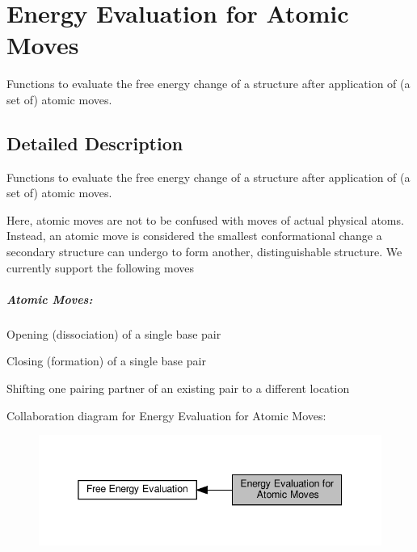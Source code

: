 \hypertarget{group__eval__move}{}\section{Energy Evaluation for Atomic Moves}
\label{group__eval__move}


Functions to evaluate the free energy change of a structure after application of (a set of) atomic moves.  




\subsection{Detailed Description}
Functions to evaluate the free energy change of a structure after application of (a set of) atomic moves. 

Here, atomic moves are not to be confused with moves of actual physical atoms. Instead, an atomic move is considered the smallest conformational change a secondary structure can undergo to form another, distinguishable structure. We currently support the following moves \subparagraph*{Atomic Moves\+:}


\begin{DoxyItemize}
\item Opening (dissociation) of a single base pair
\item Closing (formation) of a single base pair
\item Shifting one pairing partner of an existing pair to a different location 
\end{DoxyItemize}Collaboration diagram for Energy Evaluation for Atomic Moves\+:
\nopagebreak
\begin{figure}[H]
\begin{center}
\leavevmode
\includegraphics[width=345pt]{group__eval__move}
\end{center}
\end{figure}
